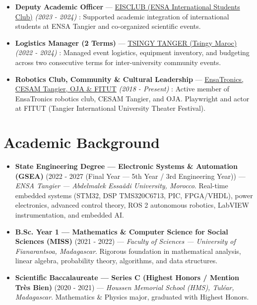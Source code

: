 \documentclass[10pt,a4paper]{article}
\begin{document}
\begin{itemize}
\item \textbf{Deputy Academic Officer} --- \href{https://www.linkedin.com/company/eisclubuae/home/}{EISCLUB (ENSA International Students Club)} \textit{(2023 - 2024)} : Supported academic integration of international students at ENSA Tangier and co-organized scientific events.
\item \textbf{Logistics Manager (2 Terms)} --- \href{https://tsingymaroc.org/}{TSINGY TANGER (Tsingy Maroc)} \textit{(2022 - 2024)} : Managed event logistics, equipment inventory, and budgeting across two consecutive terms for inter-university community events.
\item \textbf{Robotics Club, Community \& Cultural Leadership} --- \href{https://cesamcentrale.org/category/sections-cesam/tanger/}{EnsaTronics, CESAM Tangier, OJA \& FITUT} \textit{(2018 - Present)} : Active member of EnsaTronics robotics club, CESAM Tangier, and OJA. Playwright and actor at FITUT (Tangier International University Theater Festival).
\end{itemize}
\section*{Academic Background}
\begin{itemize}
\item \textbf{State Engineering Degree --- Electronic Systems \& Automation (GSEA)} (2022 - 2027 (Final Year --- 5th Year / 3rd Engineering Year)) --- \textit{ENSA Tangier --- Abdelmalek Essaâdi University, Morocco}. Real-time embedded systems (STM32, DSP TMS320C6713, PIC, FPGA/VHDL), power electronics, advanced control theory, ROS 2 autonomous robotics, LabVIEW instrumentation, and embedded AI.
\item \textbf{B.Sc. Year 1 --- Mathematics \& Computer Science for Social Sciences (MISS)} (2021 - 2022) --- \textit{Faculty of Sciences --- University of Fianarantsoa, Madagascar}. Rigorous foundation in mathematical analysis, linear algebra, probability theory, algorithms, and data structures.
\item \textbf{Scientific Baccalaureate --- Series C (Highest Honors / Mention Très Bien)} (2020 - 2021) --- \textit{Houssen Memorial School (HMS), Tuléar, Madagascar}. Mathematics \& Physics major, graduated with Highest Honors.
\end{itemize}
\end{document}
